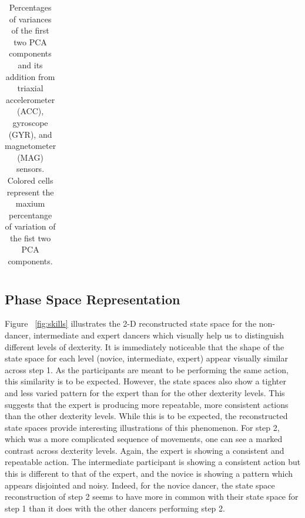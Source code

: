 \documentclass{sigchi}
\begin{document}
\begin{table}
\begin{tabular}{l c c c c c c }
\bottomrule
\end{tabular}

  \caption{Percentages of variances of the first two PCA components and its addition
       from triaxial accelerometer (ACC), gyroscope (GYR), and magnetometer (MAG) sensors.
  Colored cells represent the maxium percentange of variation of the fist two PCA components.}
  \label{tab:table2}
\end{table}


\subsection{Phase Space Representation}
Figure ~\ref{fig:skills} illustrates the 2-D reconstructed state space for the 
non-dancer, intermediate and expert dancers which visually help us to distinguish different levels of dexterity. 
It is immediately noticeable that the shape of the state space for each level (novice, intermediate, expert) 
appear visually similar across step 1.  
As the participants are meant to be performing the same action, this similarity is to be expected.  
However, the state spaces also show a tighter and less varied pattern for the expert than for the other dexterity levels.  
This suggests that the expert is producing more repeatable, more consistent actions than the other dexterity levels.  
While this is to be expected, the reconstructed state spaces provide interesting illustrations of this phenomenon.  
For step 2, which was a more complicated sequence of movements,
one can see a marked contrast across dexterity levels.  
Again, the expert is showing a consistent and repeatable action.  
The intermediate participant is showing a consistent action but this is different to that of the expert, 
and the novice is showing a pattern which appears disjointed and noisy.  
Indeed, for the novice dancer, the state space reconstruction of step 2 seems to have more in common 
with their state space for step 1 than it does with the other dancers performing step 2.  
\end{document}
